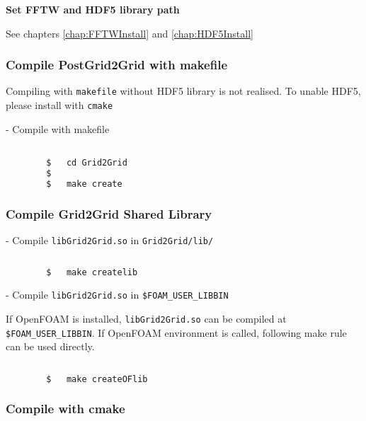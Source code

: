 		\vspace{0.2cm}
		
		\textbf{Set FFTW and HDF5 library path}
		
		See chapters \ref{chap:FFTWInstall} and \ref{chap:HDF5Install}
		
		\subsubsection{Compile PostGrid2Grid with makefile}
		
		Compiling with \texttt{makefile} without HDF5 library is not realised. To unable HDF5, please install with \texttt{cmake}
		
		\vspace{1em}
		
		- Compile with makefile
		
		\begin{lstlisting}[language=bash]										

		$	cd Grid2Grid
		$
		$	make create
		\end{lstlisting}	
		
		\subsubsection{Compile Grid2Grid Shared Library}
		
		- Compile \texttt{libGrid2Grid.so} in \texttt{Grid2Grid/lib/}
		
		\begin{lstlisting}[language=bash]
		
		$	make createlib
		\end{lstlisting}		
	
		\vspace{0.2cm}

		- Compile \texttt{libGrid2Grid.so} in \texttt{\$FOAM\_USER\_LIBBIN}
		
		If OpenFOAM is installed, \texttt{libGrid2Grid.so} can be compiled at \texttt{\$FOAM\_USER\_LIBBIN}. If OpenFOAM environment is called, following make rule can be used directly. 
		
		\begin{lstlisting}[language=bash]
		
		$	make createOFlib
		\end{lstlisting}
		
		\subsubsection{Compile with cmake}
		
